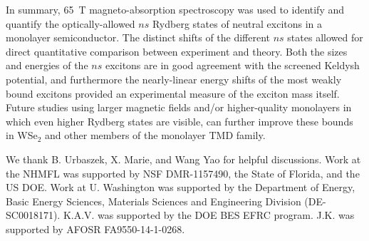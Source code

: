 \documentclass[aps,prl,twocolumn]{revtex4-1}
\begin{document}
In summary, 65~T magneto-absorption spectroscopy was used to identify and quantify the optically-allowed $ns$ Rydberg states of neutral excitons in a monolayer semiconductor. The distinct shifts of the different $ns$ states allowed for direct quantitative comparison between experiment and theory. Both the sizes and energies of the $ns$ excitons are in good agreement with the screened Keldysh potential, and furthermore the nearly-linear energy shifts of the most weakly bound excitons provided an experimental measure of the exciton mass itself. Future studies using larger magnetic fields and/or higher-quality monolayers in which even higher Rydberg states are visible, can further improve these bounds in WSe$_2$ and other members of the monolayer TMD family.

We thank B. Urbaszek, X. Marie, and Wang Yao for helpful discussions. Work at the NHMFL was supported by NSF DMR-1157490, the State of Florida, and the US DOE. Work at U. Washington was supported by the Department of Energy, Basic Energy Sciences, Materials Sciences and Engineering Division (DE-SC0018171). K.A.V. was supported by the DOE BES EFRC program. J.K. was supported by AFOSR FA9550-14-1-0268.
\end{document}
